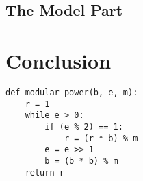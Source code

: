 \documentclass{article}
\begin{document}
\subsection{The Model Part}

\section{Conclusion}

\begin{lstlisting}
def modular_power(b, e, m):
	r = 1
	while e > 0:
		if (e % 2) == 1:
			r = (r * b) % m
		e = e >> 1
		b = (b * b) % m
	return r
\end{lstlisting}

{}

\end{document}
